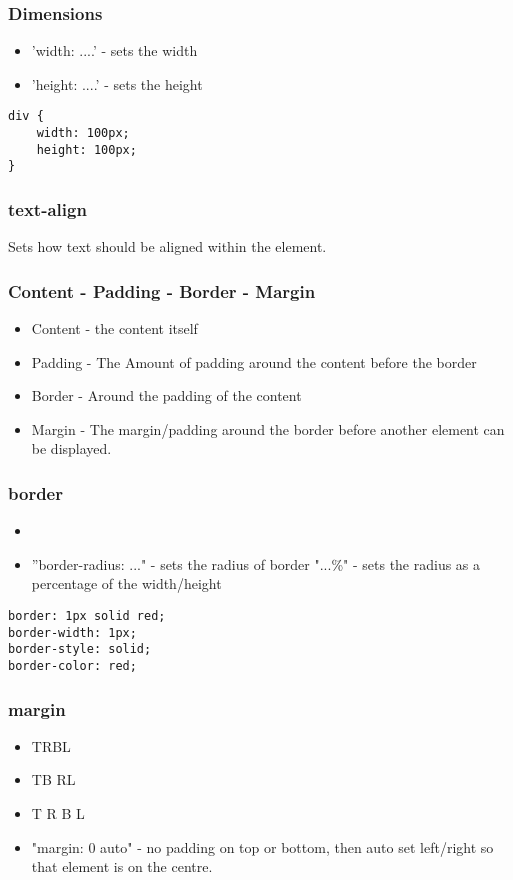 \documentclass[]{article}
\begin{document}
\subsubsection{Dimensions}
\begin{itemize}
	\item 'width: ....' - sets the width 
	\item 'height: ....' - sets the height 
\end{itemize}
\begin{lstlisting}
div {
	width: 100px;
	height: 100px;
}
\end{lstlisting}

\subsubsection{text-align}
Sets how text should be aligned within the element.

\subsubsection{Content - Padding - Border - Margin}
\begin{itemize}
	\item Content - the content itself
	\item Padding - The Amount of padding around the content before the border
	\item Border - Around the padding of the content
	\item Margin - The margin/padding around the border before another element can be displayed.
\end{itemize}

\subsubsection{border}
\begin{itemize}
	\item
	\item ''border-radius: ..." - sets the radius of border
	\subitem "...\%" - sets the radius as a percentage of the width/height
\end{itemize}
\begin{lstlisting}
border: 1px solid red;
border-width: 1px;
border-style: solid;
border-color: red;
\end{lstlisting}

\subsubsection{margin}
\begin{itemize}
	\item TRBL
	\item TB RL
	\item T R B L
	\item "margin: 0 auto" - no padding on top or bottom, then auto set left/right so that element is on the centre.
\end{itemize}
\end{document}
